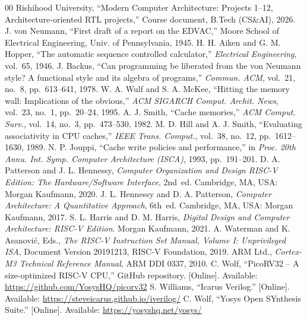 \documentclass[conference]{IEEEtran}
\begin{document}
\begin{thebibliography}{00}
 Rishihood University, ``Modern Computer Architecture: Projects 1--12, Architecture-oriented RTL projects,'' Course document, B.Tech (CS\&AI), 2026.
 J. von Neumann, ``First draft of a report on the EDVAC,'' Moore School of Electrical Engineering, Univ. of Pennsylvania, 1945.
 H. H. Aiken and G. M. Hopper, ``The automatic sequence controlled calculator,'' \textit{Electrical Engineering}, vol.~65, 1946.
 J. Backus, ``Can programming be liberated from the von Neumann style? A functional style and its algebra of programs,'' \textit{Commun. ACM}, vol.~21, no.~8, pp.~613--641, 1978.
 W. A. Wulf and S. A. McKee, ``Hitting the memory wall: Implications of the obvious,'' \textit{ACM SIGARCH Comput. Archit. News}, vol.~23, no.~1, pp.~20--24, 1995.
 A. J. Smith, ``Cache memories,'' \textit{ACM Comput. Surv.}, vol.~14, no.~3, pp.~473--530, 1982.
 M. D. Hill and A. J. Smith, ``Evaluating associativity in CPU caches,'' \textit{IEEE Trans. Comput.}, vol.~38, no.~12, pp.~1612--1630, 1989.
 N. P. Jouppi, ``Cache write policies and performance,'' in \textit{Proc. 20th Annu. Int. Symp. Computer Architecture (ISCA)}, 1993, pp.~191--201.
 D. A. Patterson and J. L. Hennessy, \textit{Computer Organization and Design RISC-V Edition: The Hardware/Software Interface}, 2nd~ed. Cambridge, MA, USA: Morgan Kaufmann, 2020.
 J. L. Hennessy and D. A. Patterson, \textit{Computer Architecture: A Quantitative Approach}, 6th~ed. Cambridge, MA, USA: Morgan Kaufmann, 2017.
 S. L. Harris and D. M. Harris, \textit{Digital Design and Computer Architecture: RISC-V Edition}. Morgan Kaufmann, 2021.
 A. Waterman and K. Asanovi\'{c}, Eds., \textit{The RISC-V Instruction Set Manual, Volume I: Unprivileged ISA}, Document Version 20191213, RISC-V Foundation, 2019.
 ARM Ltd., \textit{Cortex-M3 Technical Reference Manual}, ARM DDI 0337, 2010.
 C. Wolf, ``PicoRV32 -- A size-optimized RISC-V CPU,'' GitHub repository. [Online]. Available: \url{https://github.com/YosysHQ/picorv32}
 S. Williams, ``Icarus Verilog.'' [Online]. Available: \url{https://steveicarus.github.io/iverilog/}
 C. Wolf, ``Yosys Open SYnthesis Suite.'' [Online]. Available: \url{https://yosyshq.net/yosys/}
\end{thebibliography}
\end{document}

